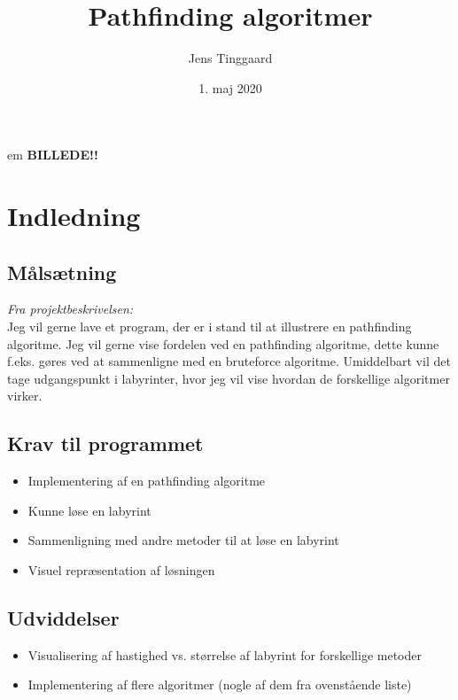 \documentclass[a4paper, 12pt]{article}
\date{1. maj 2020}
\title{Pathfinding algoritmer}
\author{Jens Tinggaard}
\begin{document}
\thispagestyle{empty}
\maketitle

 em
{\center\Huge
\textbf{BILLEDE!!}\\
}

\newpage
\tableofcontents


\newpage
\section{Indledning}
\subsection{Målsætning}
\textit{Fra projektbeskrivelsen:}\\
Jeg vil gerne lave et program, der er i stand til at illustrere en pathfinding algoritme. Jeg vil gerne vise fordelen ved en pathfinding algoritme, dette kunne f.eks. gøres ved at sammenligne med en bruteforce algoritme. Umiddelbart vil det tage udgangspunkt i labyrinter, hvor jeg vil vise hvordan de forskellige algoritmer virker.
\subsection{Krav til programmet}
\begin{itemize}
  \item Implementering af en pathfinding algoritme
  \item Kunne løse en labyrint
  \item Sammenligning med andre metoder til at løse en labyrint
  \item Visuel repræsentation af løsningen
\end{itemize}
\subsection{Udviddelser}
\begin{itemize}
  \item Visualisering af hastighed vs. størrelse af labyrint for forskellige metoder
  \item Implementering af flere algoritmer (nogle af dem fra ovenstående liste)
\end{itemize}


\newpage
\end{document}
